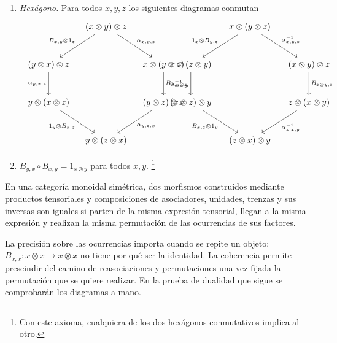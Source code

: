 \begin{defi}
\begin{enumerate}[label = \textup{(\arabic*)}, start=3]
\item\emph{Hexágono.} Para todos $x,y,z$ los siguientes diagramas conmutan
\[\noindent%
\begin{minipage}{0.48\textwidth}
\raggedright
\begin{tikzcd}[column sep = 1em, row sep = large]
& (x\otimes y)\otimes z
    \arrow[dl, "{B_{x,y}\otimes1_z}"']
    \arrow[dr, "{\alpha_{x,y,z}}"]
& \\
(y\otimes x)\otimes z
    \arrow[d, "{\alpha_{y,x,z}}"']
& &
x\otimes(y\otimes z)
    \arrow[d, "{B_{x,y\otimes z}}"]
\\
y\otimes(x\otimes z)
    \arrow[dr, "{1_y\otimes B_{x,z}}"']
& &
(y\otimes z)\otimes x
    \arrow[dl, "{\alpha_{y,z,x}}"]
\\
& y\otimes(z\otimes x) &
\end{tikzcd}
\end{minipage}%
\hfill
\begin{minipage}{0.48\textwidth}
\raggedleft
\begin{tikzcd}[column sep = small, row sep = large]
& x\otimes(y\otimes z)
    \arrow[dl, "{1_x\otimes B_{y,z}}"']
    \arrow[dr, "{\alpha^{-1}_{x,y,z}}"]
& \\
x\otimes(z\otimes y)
    \arrow[d, "{\alpha^{-1}_{x,z,y}}"']
& &
(x\otimes y)\otimes z
    \arrow[d, "{B_{x\otimes y,z}}"]
\\
(x\otimes z)\otimes y
    \arrow[dr, "{B_{x,z}\otimes1_y}"']
& &
z\otimes(x\otimes y)
    \arrow[dl, "{\alpha^{-1}_{z,x,y}}"]
\\
& (z\otimes x)\otimes y &
\end{tikzcd}
\end{minipage}
\]

\item $B_{y,x}\circ B_{x,y}=1_{x\otimes y}$ para todos $x,y$.%
\footnote{Con este axioma, cualquiera de los dos hexágonos conmutativos implica al otro.}
\end{enumerate}
\end{defi}

\begin{teo}[Coherencia]\label{teo:coherencia}
En una categoría monoidal simétrica, dos morfismos construidos mediante productos tensoriales y composiciones de asociadores, unidades, trenzas y sus inversas son iguales si parten de la misma expresión tensorial, llegan a la misma expresión y realizan la misma permutación de las ocurrencias de sus factores.
\end{teo}

\begin{nota}
La precisión sobre las ocurrencias importa cuando se repite un objeto: $B_{x,x}\colon x\otimes x\to x\otimes x$ no tiene por qué ser la identidad. La coherencia permite prescindir del camino de reasociaciones y permutaciones una vez fijada la permutación que se quiere realizar. En la prueba de dualidad que sigue se comprobarán los diagramas a mano.
\end{nota}

